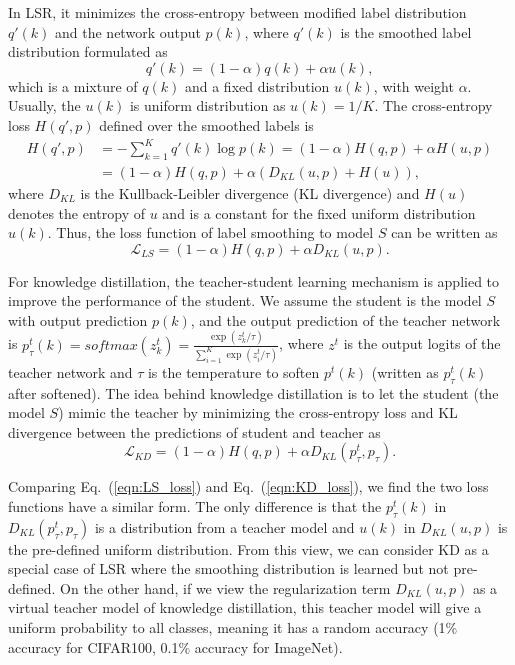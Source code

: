 \documentclass[10pt,twocolumn,letterpaper]{article}
\begin{document}
In LSR, it minimizes the cross-entropy between modified label distribution ${q}'(k)$ and the network output $p(k)$, where ${q}'(k)$ is the smoothed label distribution formulated as
\vspace{-5pt}
\begin{equation}
{q}'(k)=(1-\alpha)q(k) + \alpha u(k),
\label{eqn:LS_q}
\end{equation}
which is a mixture of $q(k)$ and a fixed distribution $u(k)$, with weight $\alpha$. Usually, the $u(k)$ is uniform distribution as $u(k)=1/K$. The cross-entropy loss $H({q}', p)$ defined over the smoothed labels is
\vspace{-5pt}
\begin{equation}
\label{eqn:CE_loss}
\begin{aligned}
    H({q}', p)&=-\sum_{k=1}^{K}{q}'(k)\log p(k)=(1-\alpha)H(q,p)+\alpha H(u, p) \\
              &=(1-\alpha)H(q,p)+\alpha (D_{KL}(u, p)+H(u)),
\end{aligned}
\end{equation}
where $D_{KL}$ is the Kullback-Leibler divergence (KL divergence) and $H(u)$ denotes the entropy of $u$ and is a constant for the fixed uniform distribution $u(k)$. Thus, the loss function of label smoothing to model $S$ can be written as
\begin{equation}
\label{eqn:LS_loss}
    \mathcal{L}_{LS}=(1-\alpha)H(q,p)+\alpha D_{KL}(u, p).
\end{equation}

For knowledge distillation, the teacher-student learning mechanism is applied to improve the performance of the student. We assume the student is the model $S$ with output prediction $p(k)$, and the output prediction of the teacher network is $p^{t}_{\tau}(k)=softmax(z^{t}_{k})=\frac{\exp(z^{t}_{k}/\tau)}{\sum_{i=1}^{K}\exp(z^{t}_{i}/\tau)}$, where $z^{t}$ is the output logits of the teacher network and $\tau$ is the temperature to soften $p^{t}(k)$ (written as $p^{t}_{\tau}(k)$ after softened). The idea behind knowledge distillation is to let the student (the model $S$) mimic the teacher by minimizing the cross-entropy loss and KL divergence between the predictions of student and teacher as
\begin{equation}
\label{eqn:KD_loss}
    \mathcal{L}_{KD} = (1-\alpha)H(q, p) + \alpha D_{KL}(p^{t}_{\tau}, p_{\tau}).
\end{equation}

Comparing Eq.~(\ref{eqn:LS_loss}) and Eq.~(\ref{eqn:KD_loss}), we find the two loss functions have a similar form.  The only difference is that the $p^{t}_{\tau}(k)$ in $D_{KL}(p^{t}_{\tau}, p_{\tau})$ is a distribution from a teacher model and $u(k)$ in $D_{KL}(u, p)$ is the pre-defined uniform distribution. From this view, we can consider KD as a special case of LSR where the smoothing distribution is learned but not pre-defined. On the other hand, if we view the regularization term $D_{KL}(u, p)$ as a virtual teacher model of knowledge distillation, this teacher model will give a uniform probability to all classes, meaning it has a random accuracy (1\% accuracy for CIFAR100, 0.1\% accuracy for ImageNet).
\end{document}
